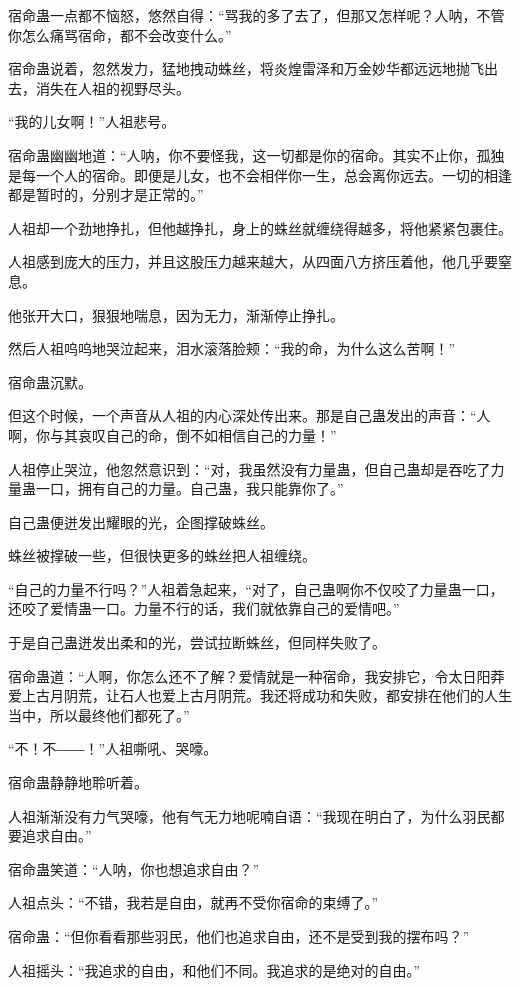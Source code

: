 \begin{this_body}
宿命蛊一点都不恼怒，悠然自得：“骂我的多了去了，但那又怎样呢？人呐，不管你怎么痛骂宿命，都不会改变什么。”

宿命蛊说着，忽然发力，猛地拽动蛛丝，将炎煌雷泽和万金妙华都远远地抛飞出去，消失在人祖的视野尽头。

“我的儿女啊！”人祖悲号。

宿命蛊幽幽地道：“人呐，你不要怪我，这一切都是你的宿命。其实不止你，孤独是每一个人的宿命。即便是儿女，也不会相伴你一生，总会离你远去。一切的相逢都是暂时的，分别才是正常的。”

人祖却一个劲地挣扎，但他越挣扎，身上的蛛丝就缠绕得越多，将他紧紧包裹住。

人祖感到庞大的压力，并且这股压力越来越大，从四面八方挤压着他，他几乎要窒息。

他张开大口，狠狠地喘息，因为无力，渐渐停止挣扎。

然后人祖呜呜地哭泣起来，泪水滚落脸颊：“我的命，为什么这么苦啊！”

宿命蛊沉默。

但这个时候，一个声音从人祖的内心深处传出来。那是自己蛊发出的声音：“人啊，你与其哀叹自己的命，倒不如相信自己的力量！”

人祖停止哭泣，他忽然意识到：“对，我虽然没有力量蛊，但自己蛊却是吞吃了力量蛊一口，拥有自己的力量。自己蛊，我只能靠你了。”

自己蛊便迸发出耀眼的光，企图撑破蛛丝。

蛛丝被撑破一些，但很快更多的蛛丝把人祖缠绕。

“自己的力量不行吗？”人祖着急起来，“对了，自己蛊啊你不仅咬了力量蛊一口，还咬了爱情蛊一口。力量不行的话，我们就依靠自己的爱情吧。”

于是自己蛊迸发出柔和的光，尝试拉断蛛丝，但同样失败了。

宿命蛊道：“人啊，你怎么还不了解？爱情就是一种宿命，我安排它，令太日阳莽爱上古月阴荒，让石人也爱上古月阴荒。我还将成功和失败，都安排在他们的人生当中，所以最终他们都死了。”

“不！不――！”人祖嘶吼、哭嚎。

宿命蛊静静地聆听着。

人祖渐渐没有力气哭嚎，他有气无力地呢喃自语：“我现在明白了，为什么羽民都要追求自由。”

宿命蛊笑道：“人呐，你也想追求自由？”

人祖点头：“不错，我若是自由，就再不受你宿命的束缚了。”

宿命蛊：“但你看看那些羽民，他们也追求自由，还不是受到我的摆布吗？”

人祖摇头：“我追求的自由，和他们不同。我追求的是绝对的自由。”


\end{this_body}
